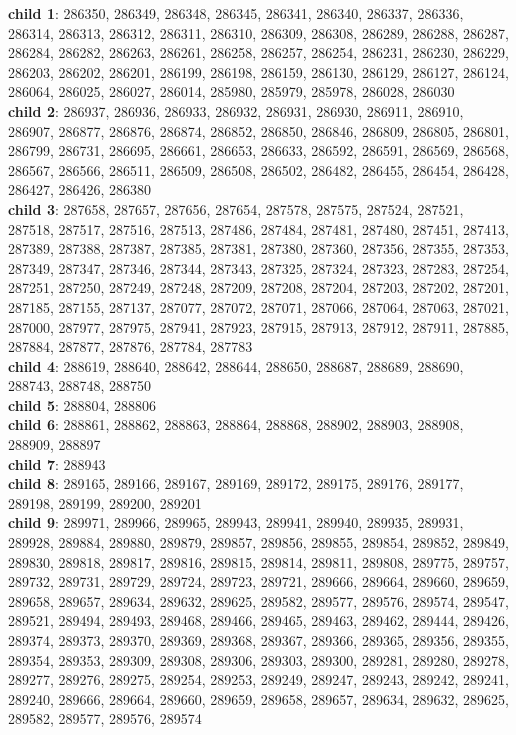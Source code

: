 \begin{itemize}
	\textbf{child 1}: 286350, 286349, 286348, 286345, 286341, 286340, 286337, 286336, 286314, 286313, 286312, 286311, 286310, 286309, 286308, 286289, 286288, 286287, 286284, 286282, 286263, 286261, 286258, 286257, 286254, 286231, 286230, 286229, 286203, 286202, 286201, 286199, 286198, 286159, 286130, 286129, 286127, 286124, 286064, 286025, 286027, 286014, 285980, 285979, 285978, 286028, 286030 \\
	\textbf{child 2}: 286937, 286936, 286933, 286932, 286931, 286930, 286911, 286910, 286907, 286877, 286876, 286874, 286852, 286850, 286846, 286809, 286805, 286801, 286799, 286731, 286695, 286661, 286653, 286633, 286592, 286591, 286569, 286568, 286567, 286566, 286511, 286509, 286508, 286502, 286482, 286455, 286454, 286428, 286427, 286426, 286380 \\
	\textbf{child 3}:  287658, 287657, 287656, 287654, 287578, 287575, 287524, 287521, 287518, 287517, 287516, 287513, 287486, 287484, 287481, 287480, 287451, 287413, 287389, 287388, 287387, 287385, 287381, 287380, 287360, 287356, 287355, 287353, 287349, 287347, 287346, 287344, 287343, 287325, 287324, 287323, 287283, 287254, 287251, 287250, 287249, 287248, 287209, 287208, 287204, 287203, 287202, 287201, 287185, 287155, 287137, 287077, 287072, 287071, 287066, 287064, 287063, 287021, 287000, 287977, 287975, 287941, 287923, 287915, 287913, 287912, 287911, 287885, 287884, 287877, 287876, 287784, 287783 \\
	\textbf{child 4}: 288619, 288640, 288642, 288644, 288650, 288687, 288689, 288690, 288743, 288748, 288750 \\
	\textbf{child 5}: 288804, 288806 \\
	\textbf{child 6}: 288861, 288862, 288863, 288864, 288868, 288902, 288903, 288908, 288909, 288897 \\
	\textbf{child 7}: 288943 \\
	\textbf{child 8}: 289165, 289166, 289167, 289169, 289172, 289175, 289176, 289177, 289198, 289199, 289200, 289201 \\
	\textbf{child 9}: 289971, 289966, 289965, 289943, 289941, 289940, 289935, 289931, 289928, 289884, 289880, 289879, 289857, 289856, 289855, 289854, 289852, 289849, 289830, 289818, 289817, 289816, 289815, 289814, 289811, 289808, 289775, 289757, 289732, 289731, 289729, 289724, 289723, 289721, 289666, 289664, 289660, 289659, 289658, 289657, 289634, 289632, 289625, 289582, 289577, 289576, 289574, 289547, 289521, 289494, 289493, 289468, 289466, 289465, 289463, 289462, 289444, 289426, 289374, 289373, 289370, 289369, 289368, 289367, 289366, 289365, 289356, 289355, 289354, 289353, 289309, 289308, 289306, 289303, 289300, 289281, 289280, 289278, 289277, 289276, 289275, 289254, 289253, 289249, 289247, 289243, 289242, 289241, 289240, 289666, 289664, 289660, 289659, 289658, 289657, 289634, 289632, 289625, 289582, 289577, 289576, 289574 \\

\end{itemize}
